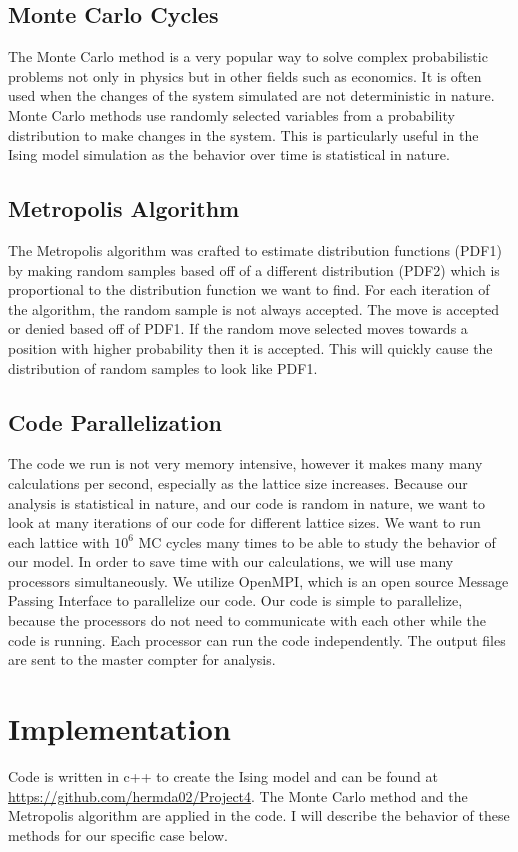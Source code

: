 \documentclass[a4paper]{article}
\begin{document}
\subsection{Monte Carlo Cycles}
The Monte Carlo method is a very popular way to solve complex probabilistic problems not only in physics but in other fields such as economics. It is often used when the changes of the system simulated are not deterministic in nature. Monte Carlo methods use randomly selected variables from a probability distribution to make changes in the system. This is particularly useful in the Ising model simulation as the behavior over time is statistical in nature.
\subsection{Metropolis Algorithm}
The Metropolis algorithm was crafted to estimate distribution functions (PDF1) by making random samples based off of a different distribution (PDF2) which is proportional to the distribution function we want to find. For each iteration of the algorithm, the random sample is not always accepted. The move is accepted or denied based off of PDF1. If the random move selected moves towards a position with higher probability then it is accepted. This will quickly cause the distribution of random samples to look like PDF1.
\clearpage
\subsection{Code Parallelization}
The code we run is not very memory intensive, however it makes many many calculations per second, especially as the lattice size increases. Because our analysis is statistical in nature, and our code is random in nature, we want to look at many iterations of our code for different lattice sizes. We want to run each lattice with $10^6$ MC cycles many times to be able to study the behavior of our model. In order to save time with our calculations, we will use many processors simultaneously. We utilize OpenMPI, which is an open source Message Passing Interface to parallelize our code. Our code is simple to parallelize, because the processors do not need to communicate with each other while the code is running. Each processor can run the code independently. The output files are sent to the master compter for analysis. 
\clearpage


\section{Implementation}\label{implementation}
Code is written in c++ to create the Ising model and can be found at \url{https://github.com/hermda02/Project4}. The Monte Carlo method and the Metropolis algorithm are applied in the code. I will describe the behavior of these methods for our specific case below.
\end{document}
